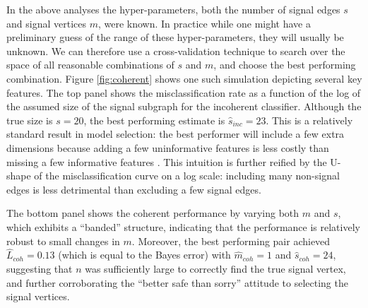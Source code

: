 \documentclass[10pt,journal,cspaper,compsoc]{IEEEtran}
\providecommand{\mh}[1]{\hat{#1}}
\begin{document}
In the above analyses the hyper-parameters, both the number of signal edges $s$ and signal vertices $m$, were known.  In practice while one might have a preliminary guess of the range of these hyper-parameters, they will usually be unknown.  We can therefore use a cross-validation technique to search over the space of all reasonable combinations of $s$ and $m$, and choose the best performing combination.  Figure \ref{fig:coherent} shows one such simulation depicting several key features.  The top panel shows the misclassification rate as a function of the log of the assumed size of the signal subgraph for the incoherent classifier.  Although the true size is $s=20$, the best performing estimate is $\mh{s}_{inc}=23$. This is a relatively standard result in model selection: the best performer will include a few extra dimensions because adding a few uninformative features is less costly than missing a few informative features \cite{Jain2000}.  This intuition is further reified by the U-shape of the misclassification curve on a log scale: including many non-signal edges is less detrimental than excluding a few signal edges.

The bottom panel shows the coherent performance by varying both $m$ and $s$, which exhibits a ``banded''  structure, indicating that the performance is relatively robust to small changes in $m$.  Moreover, the best performing pair achieved $\mh{L}_{coh}=0.13$ (which is equal to the Bayes error) with $\mh{m}_{coh}=1$ and $\mh{s}_{coh}=24$, suggesting that $n$ was sufficiently large to correctly find the true signal vertex, and further corroborating the ``better safe than sorry'' attitude to selecting the signal vertices. 
\end{document}
